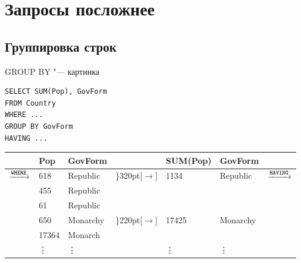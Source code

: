 \section{Запросы посложнее}
\begin{frame}
	\tableofcontents[currentsection]
\end{frame}

\subsection{Группировка строк}
\begin{frame}
\end{frame}

\begin{frame}[fragile]{GROUP BY "--- картинка}
	\begin{center}
		\begin{minipage}{0.4\textwidth}
\begin{verbatim}
SELECT SUM(Pop), GovForm
FROM Country
WHERE ...
GROUP BY GovForm
HAVING ...
\end{verbatim}
		\end{minipage}
\vspace{10pt}

		\begin{tabular}{rllclll}
			\hline
			& Pop & GovForm & & SUM(Pop) & GovForm & \\\hline
			\multirow{6}{*}{$\xrightarrow{\t{WHERE}}$} & 618 & Republic & \rdelim\}{3}{20pt}[$\longrightarrow$] & \multirow{3}{*}{1134} & \multirow{3}{*}{Republic} & \multirow{6}{*}{$\xrightarrow{\t{HAVING}}$}\\
			& 455 & Republic \\
			& 61 & Republic \\
			& 650 & Monarchy & \rdelim\}{2}{20pt}[$\longrightarrow$] & \multirow{2}{*}{17425} & \multirow{2}{*}{Monarchy} & \\
			& 17364 & Monarch \\
			& \vdots & \vdots & & \vdots & \vdots & \\
		\end{tabular}
	\end{center}
\end{frame}


